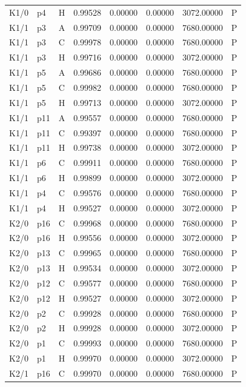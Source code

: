 \begin{longtable}{llllllll}
K1/0 & p4 & H & 0.99528 & 0.00000 & 0.00000 & 3072.00000 & P \\
K1/1 & p3 & A & 0.99709 & 0.00000 & 0.00000 & 7680.00000 & P \\
K1/1 & p3 & C & 0.99978 & 0.00000 & 0.00000 & 7680.00000 & P \\
K1/1 & p3 & H & 0.99716 & 0.00000 & 0.00000 & 3072.00000 & P \\
K1/1 & p5 & A & 0.99686 & 0.00000 & 0.00000 & 7680.00000 & P \\
K1/1 & p5 & C & 0.99982 & 0.00000 & 0.00000 & 7680.00000 & P \\
K1/1 & p5 & H & 0.99713 & 0.00000 & 0.00000 & 3072.00000 & P \\
K1/1 & p11 & A & 0.99557 & 0.00000 & 0.00000 & 7680.00000 & P \\
K1/1 & p11 & C & 0.99397 & 0.00000 & 0.00000 & 7680.00000 & P \\
K1/1 & p11 & H & 0.99738 & 0.00000 & 0.00000 & 3072.00000 & P \\
K1/1 & p6 & C & 0.99911 & 0.00000 & 0.00000 & 7680.00000 & P \\
K1/1 & p6 & H & 0.99899 & 0.00000 & 0.00000 & 3072.00000 & P \\
K1/1 & p4 & C & 0.99576 & 0.00000 & 0.00000 & 7680.00000 & P \\
K1/1 & p4 & H & 0.99527 & 0.00000 & 0.00000 & 3072.00000 & P \\
K2/0 & p16 & C & 0.99968 & 0.00000 & 0.00000 & 7680.00000 & P \\
K2/0 & p16 & H & 0.99556 & 0.00000 & 0.00000 & 3072.00000 & P \\
K2/0 & p13 & C & 0.99965 & 0.00000 & 0.00000 & 7680.00000 & P \\
K2/0 & p13 & H & 0.99534 & 0.00000 & 0.00000 & 3072.00000 & P \\
K2/0 & p12 & C & 0.99577 & 0.00000 & 0.00000 & 7680.00000 & P \\
K2/0 & p12 & H & 0.99527 & 0.00000 & 0.00000 & 3072.00000 & P \\
K2/0 & p2 & C & 0.99928 & 0.00000 & 0.00000 & 7680.00000 & P \\
K2/0 & p2 & H & 0.99928 & 0.00000 & 0.00000 & 3072.00000 & P \\
K2/0 & p1 & C & 0.99993 & 0.00000 & 0.00000 & 7680.00000 & P \\
K2/0 & p1 & H & 0.99970 & 0.00000 & 0.00000 & 3072.00000 & P \\
K2/1 & p16 & C & 0.99970 & 0.00000 & 0.00000 & 7680.00000 & P \\

\end{longtable}

